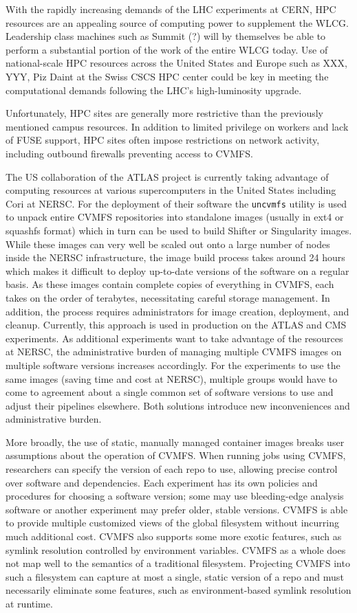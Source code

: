\documentclass[sigconf]{acmart}
\begin{document}
With the rapidly increasing demands of the LHC experiments at CERN,
HPC resources are an appealing source of computing power to supplement the WLCG.
Leadership class machines such as Summit (?) will by themselves be able to perform a substantial portion of the work of the entire WLCG today.
Use of national-scale HPC resources across the United States and Europe such as XXX, YYY, Piz Daint at the Swiss CSCS HPC center could be key in meeting the computational demands following the LHC's high-luminosity upgrade.

Unfortunately, HPC sites are generally more restrictive than the previously mentioned campus resources.
In addition to limited privilege on workers and lack of FUSE support,
HPC sites often impose restrictions on network activity,
including outbound firewalls preventing access to CVMFS.

The US collaboration of the ATLAS project is currently taking advantage of computing resources at various supercomputers in the United States including Cori at NERSC.
For the deployment of their software the \texttt{uncvmfs} utility is used to unpack entire CVMFS repositories into standalone images (usually in ext4 or squashfs format) which in turn can be used to build Shifter or Singularity images.
While these images can very well be scaled out onto a large number of nodes inside the NERSC infrastructure,
the image build process takes around 24 hours which makes it difficult to deploy up-to-date versions of the software on a regular basis.
As these images contain complete copies of everything in CVMFS,
each takes on the order of terabytes,
necessitating careful storage management.
In addition, the process requires administrators for image creation, deployment, and cleanup.
Currently, this approach is used in production on the ATLAS and CMS experiments.
As additional experiments want to take advantage of the resources at NERSC,
the administrative burden of managing multiple CVMFS images on multiple software versions increases accordingly.
For the experiments to use the same images (saving time and cost at NERSC),
multiple groups would have to come to agreement about a single common set of software versions to use and adjust their pipelines elsewhere.
Both solutions introduce new inconveniences and administrative burden.

More broadly, the use of static, manually managed container images breaks user assumptions about the operation of CVMFS.
When running jobs using CVMFS,
researchers can specify the version of each repo to use,
allowing precise control over software and dependencies.
Each experiment has its own policies and procedures for choosing a software version;
some may use bleeding-edge analysis software or another experiment may prefer older, stable versions.
CVMFS is able to provide multiple customized views of the global filesystem without incurring much additional cost.
CVMFS also supports some more exotic features,
such as symlink resolution controlled by environment variables.
CVMFS as a whole does not map well to the semantics of a traditional filesystem.
Projecting CVMFS into such a filesystem can capture at most a single, static version of a repo and must necessarily eliminate some features,
such as environment-based symlink resolution at runtime.
\end{document}
